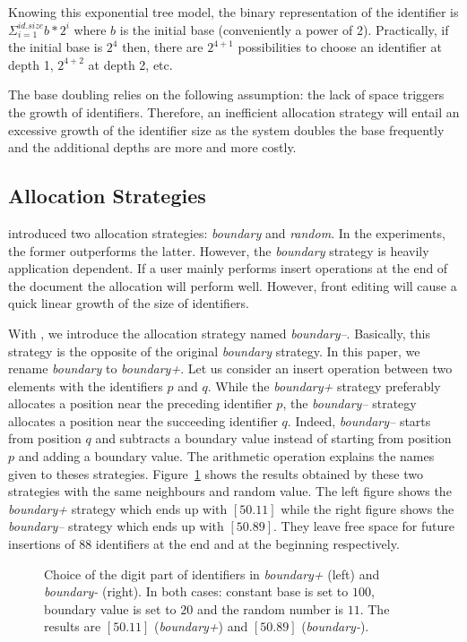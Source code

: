 Knowing this exponential tree model, the binary representation of the
identifier is $\Sigma_{i=1}^{id.size} b*2^i$ where $b$ is the initial base
(conveniently a power of 2). Practically, if the initial base is $2^4$ then,
there are $2^{4+1}$ possibilities to choose an identifier at depth 1, $2^{4+2}$
at depth 2, etc.

The base doubling relies on the following assumption: the lack of space
triggers the growth of identifiers. Therefore, an inefficient allocation
strategy will entail an excessive growth of the identifier size as the system
doubles the base frequently and the additional depths are more and more
costly.

\subsection{Allocation Strategies}

\cite{weiss2009logoot} introduced two allocation strategies: \emph{boundary}
and \emph{random}. In the experiments, the former outperforms the
latter. However, the \emph{boundary} strategy is heavily application
dependent. If a user mainly performs insert operations at the end of the
document the allocation will perform well. However, front editing will cause a
quick linear growth of the size of identifiers.

With \NAME{}, we introduce the allocation strategy named
\emph{boundary--}. Basically, this strategy is the opposite of the original
\emph{boundary} strategy. In this paper, we rename \emph{boundary} to
\emph{boundary+}. Let us consider an insert operation between two elements with
the identifiers $p$ and $q$. While the \emph{boundary+} strategy preferably
allocates a position near the preceding identifier $p$, the \emph{boundary--}
strategy allocates a position near the succeeding identifier $q$. Indeed,
\emph{boundary--} starts from position $q$ and subtracts a boundary value
instead of starting from position $p$ and adding a boundary value. The
arithmetic operation explains the names given to theses
strategies. Figure~\ref{img:positionchoice} shows the results obtained by these
two strategies with the same neighbours and random value. The left figure shows
the \emph{boundary+} strategy which ends up with $[50.11]$ while the right
figure shows the \emph{boundary--} strategy which ends up with $[50.89]$. They
leave free space for future insertions of 88 identifiers at the end and at the
beginning respectively.

\begin{figure}[h]
\addtolength{\belowcaptionskip}{-10pt}
\begin{center}

\caption{Choice of the digit part of identifiers in \emph{boundary+} (left) and
  \emph{boundary-} (right). In both cases: constant base is set to $100$,
  boundary value is set to $20$ and the random number is $11$. The results are
  $[50.11]$ (\emph{boundary+}) and $[50.89]$ (\emph{boundary-}).}
\label{img:positionchoice}
\end{center}
\end{figure}

